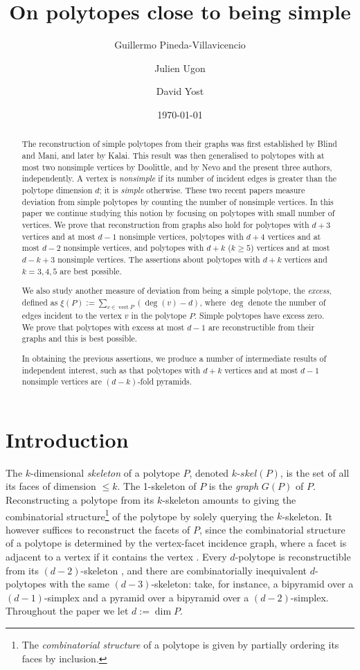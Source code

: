 \documentclass[a4paper]{amsart}
\date{\today}
\title{On polytopes close to being simple}
\author{Guillermo Pineda-Villavicencio}
\author{Julien Ugon}
\author{David Yost}
\theoremstyle{definition}
\theoremstyle{remark}
\begin{document}
\begin{abstract} The reconstruction of simple polytopes from their graphs was first established by Blind and Mani, and later by Kalai. This result was then generalised to polytopes with at most two nonsimple vertices by Doolittle,  and by Nevo and the present three authors, independently. A vertex is \emph{nonsimple} if its number of incident edges is greater than the polytope dimension $d$; it is {\it simple} otherwise. These two recent papers measure deviation from simple polytopes by counting the number of nonsimple vertices. In this paper we continue studying this notion by focusing on polytopes with small number of vertices. We prove  that reconstruction from graphs also hold for polytopes with $d+3$ vertices and at most $d-1$ nonsimple vertices, polytopes with $d+4$ vertices and at most $d-2$ nonsimple vertices, and polytopes with $d+k$ ($k\ge 5$) vertices and at most  $d-k+3$ nonsimple vertices. The assertions about polytopes with $d+k$ vertices and $k=3,4,5$ are best possible.

We also study another measure of deviation from being a simple polytope, the {\it excess}, defined as $\xi(P):=\sum_{v\in \operatorname{vert} P} (\deg(v)-d)$, where $\deg$ denote the number of edges incident to the vertex $v$ in the polytope $P$. Simple polytopes have excess zero. We prove that polytopes with excess at most $d-1$ are reconstructible from their graphs and this is best possible.
  
In obtaining the previous assertions, we produce a number of intermediate results of independent interest, such as that polytopes with $d+k$ vertices and at most $d-1$ nonsimple vertices are $(d-k)$-fold pyramids.  
\end{abstract}
\maketitle

\section{Introduction}

The $k$-dimensional {\it skeleton} of a polytope $P$, denoted $k$-$skel(P)$, is the set of all its faces of dimension $\le k$. The 1-skeleton of $P$ is the {\it graph} $G(P)$ of $P$. Reconstructing  a polytope from its $k$-skeleton amounts to giving the combinatorial structure\footnote{The {\it combinatorial structure} of a polytope is given by partially ordering its faces by inclusion.} of the polytope by solely querying the $k$-skeleton. It however suffices to reconstruct the facets of $P$, since the combinatorial structure of  a polytope is determined by the vertex-facet incidence graph, where a facet is adjacent to a vertex if it contains the vertex \cite[Sec.~16.1.1]{GooORo04}. Every $d$-polytope is reconstructible from its $(d-2)$-skeleton \cite[Thm.~12.3.1]{Gru03}, and there are combinatorially inequivalent $d$-polytopes with the same $(d-3)$-skeleton: take, for instance, a bipyramid over a $(d-1)$-simplex and a pyramid over a bipyramid over a $(d-2)$-simplex. Throughout the paper we let $d:=\dim P$.
\end{document}
